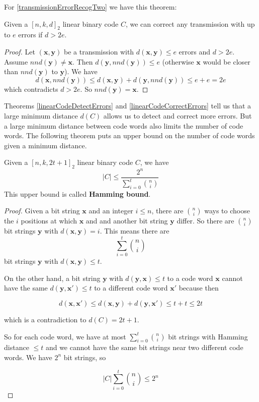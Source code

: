 For \ref{transmissionErrorRecogTwo} we have this theorem:

\begin{thm}\label{linearCodeCorrectErrors}
Given a $[n, k, d]_2$ linear binary code $C$, we can correct any transmission with up to $e$ errors if $d > 2 e$.
\end{thm}

\begin{proof}
Let $(\bm{x}, \bm{y})$ be a transmission with $d(\bm{x}, \bm{y}) \leq e$ errors and $d > 2 e$. Assume $nnd(\bm{y}) \neq \bm{x}$. Then $d(\bm{y}, nnd(\bm{y})) \leq e$ (otherwise $\bm{x}$ would be closer than $nnd(\bm{y})$ to $\bm{y}$). We have
$$
d(\bm{x}, nnd(\bm{y})) \leq d(\bm{x}, \bm{y}) + d(\bm{y}, nnd(\bm{y})) \leq e + e = 2 e
$$
which contradicts $d > 2 e$. So $nnd(\bm{y}) = \bm{x}$.

\end{proof}

Theorems \ref{linearCodeDetectErrors} and \ref{linearCodeCorrectErrors} tell us that a large minimum distance $d(C)$ allows us to detect and correct more errors. But a large minimum distance between code words also limits the number of code words. The following theorem puts an upper bound on the number of code words given a minimum distance.

\begin{thm}\label{hammingBound}
Given a $[n, k, 2 t + 1]_2$ linear binary code $C$, we have
$$
|C| \leq \frac{2^n}{\sum_{i = 0}^t \binom{n}{i}}
$$
This upper bound is called \textbf{Hamming bound}.
\end{thm}

\begin{proof}

Given a bit string $\bm{x}$ and an integer $i \leq n$, there are $\binom{n}{i}$ ways to choose the $i$ positions at which $\bm{x}$ and and another bit string $\bm{y}$ differ. So there are $\binom{n}{i}$ bit strings $\bm{y}$ with $d(\bm{x}, \bm{y}) = i$. This means there are 
$$
\sum_{i = 0}^t \binom{n}{i}
$$
bit strings $\bm{y}$ with $d(\bm{x}, \bm{y}) \leq t$.

On the other hand, a bit string $\bm{y}$ with $d(\bm{y}, \bm{x}) \leq t$ to a code word $\bm{x}$ cannot have the same  
$d(\bm{y}, \bm{x'}) \leq t$ to a different code word $\bm{x'}$ because then

$$
d(\bm{x}, \bm{x'}) \leq d(\bm{x}, \bm{y}) + d(\bm{y}, \bm{x'}) \leq t + t \leq 2 t
$$

which is a contradiction to $d(C) = 2 t + 1$.

So for each code word, we have at most $\sum_{i = 0}^t \binom{n}{i}$ bit strings with Hamming distance $\leq t$ and we cannot have the same bit strings near two different code words. We have $2^n$ bit strings, so

$$
|C| \sum_{i = 0}^t \binom{n}{i} \leq 2^n
$$

\end{proof}

